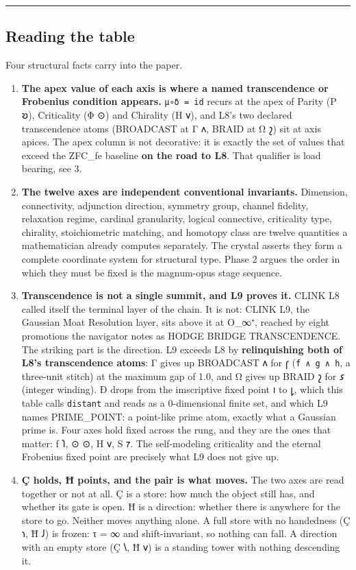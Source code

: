 \begin{center}\rule{0.5\linewidth}{0.5pt}\end{center}

\hypertarget{reading-the-table}{%
\subsection{Reading the table}\label{reading-the-table}}

Four structural facts carry into the paper.

\begin{enumerate}
\def\labelenumi{\arabic{enumi}.}
\item
  \textbf{The apex value of each axis is where a named transcendence or
  Frobenius condition appears.} \texttt{μ∘δ\ =\ id} recurs at the apex
  of Parity (P 𐑹), Criticality (Φ ⊙) and Chirality (H 𐑫), and L8's two
  declared transcendence atoms (BROADCAST at Γ 𐑵, BRAID at Ω 𐑟) sit at
  axis apices. The apex column is not decorative: it is exactly the set
  of values that exceed the ZFC\_fe baseline \textbf{on the road to L8}.
  That qualifier is load bearing, see 3.
\item
  \textbf{The twelve axes are independent conventional invariants.}
  Dimension, connectivity, adjunction direction, symmetry group, channel
  fidelity, relaxation regime, cardinal granularity, logical connective,
  criticality type, chirality, stoichiometric matching, and homotopy
  class are twelve quantities a mathematician already computes
  separately. The crystal asserts they form a complete coordinate system
  for structural type. Phase 2 argues the order in which they must be
  fixed is the magnum-opus stage sequence.
\item
  \textbf{Transcendence is not a single summit, and L9 proves it.} CLINK
  L8 called itself the terminal layer of the chain. It is not: CLINK L9,
  the Gaussian Moat Resolution layer, sits above it at O\_∞⁺, reached by
  eight promotions the navigator notes as HODGE BRIDGE TRANSCENDENCE.
  The striking part is the direction. L9 exceeds L8 by
  \textbf{relinquishing both of L8's transcendence atoms}: Γ gives up
  BROADCAST 𐑵 for 𐑝 (\texttt{f\ ∧\ g\ ∧\ h}, a three-unit stitch) at the
  maximum gap of 1.0, and Ω gives up BRAID 𐑟 for 𐑭 (integer winding). Ð
  drops from the imscriptive fixed point 𐑦 to 𐑛, which this table calls
  \texttt{distant} and reads as a 0-dimensional finite set, and which L9
  names PRIME\_POINT: a point-like prime atom, exactly what a Gaussian
  prime is. Four axes hold fixed across the rung, and they are the ones
  that matter: ƒ 𐑐, ⊙ ⊙, H 𐑫, S 𐑳. The self-modeling criticality and the
  eternal Frobenius fixed point are precisely what L9 does not give up.
\item
  \textbf{Ç holds, Ħ points, and the pair is what moves.} The two axes
  are read together or not at all. Ç is a store: how much the object
  still has, and whether its gate is open. Ħ is a direction: whether
  there is anywhere for the store to go. Neither moves anything alone. A
  full store with no handedness (Ç 𐑪, Ħ 𐑓) is frozen: τ = ∞ and
  shift-invariant, so nothing can fall. A direction with an empty store
  (Ç 𐑘, Ħ 𐑫) is a standing tower with nothing descending it.


\end{enumerate}
